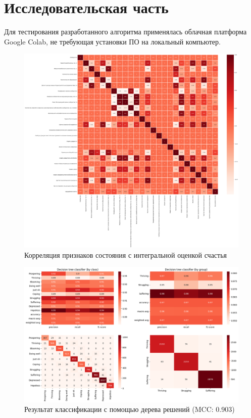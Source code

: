 \chapter{Исследовательская часть}

Для тестирования разработанного алгоритма применялась облачная платформа Google Colab, не требующая установки ПО на локальный компьютер.

\begin{figure}
	\begin{center}
		\includegraphics[width=\textwidth]{images/1.png}
	\end{center}
	\caption{Корреляция признаков состояния с интегральной оценкой счастья}
	\label{img:1}
\end{figure}

\begin{figure}
	\begin{center}
		\includegraphics[width=\textwidth]{images/2.png}
	\end{center}
	\caption{Результат классификации с помощью дерева решений (MCC: 0.903)}
	\label{img:2}
\end{figure}

